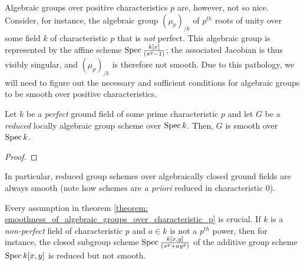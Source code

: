                 Algebraic groups over positive characteristics $p$ are, however, not so nice. Consider, for instance, the algebraic group $(\mu_p)_{/k}$ of $p^{th}$ roots of unity over some field $k$ of characteristic $p$ that is \textit{not} perfect. This algebraic group is represented by the affine scheme $\operatorname{Spec} \frac{k[x]}{(x^p - 1)}$; the associated Jacobian is thus visibly singular, and $(\mu_p)_{/k}$ is therefore not smooth. Due to this pathology, we will need to figure out the necessary and sufficient conditions for algebraic groups to be smooth over positive characteristics.
                \begin{theorem} \label{theorem: smoothness_of_algebraic_groups_over_characteristic_p} 
                    Let $k$ be a \textit{perfect} ground field of some prime characteristic $p$ and let $G$ be a \textit{reduced} locally algebraic group scheme over $\operatorname{Spec} k$. Then, $G$ is smooth over $\operatorname{Spec} k$.
                \end{theorem}
                    \begin{proof}
                        
                    \end{proof}
                \begin{corollary}
                    In particular, reduced group schemes over algebraically closed ground fields are always smooth (note how schemes are \textit{a priori} reduced in characteristic $0$).
                \end{corollary}
                \begin{remark}
                    Every assumption in theorem \ref{theorem: smoothness_of_algebraic_groups_over_characteristic_p} is crucial. If $k$ is a \textit{non-perfect} field of characteristic $p$ and $a \in k$ is not a $p^{th}$ power, then for instance, the closed subgroup scheme $\operatorname{Spec} \frac{k[x, y]}{(x^p + ay^p)}$ of the additive group scheme $\operatorname{Spec} k[x, y]$ is reduced but not smooth.
                \end{remark}
                
